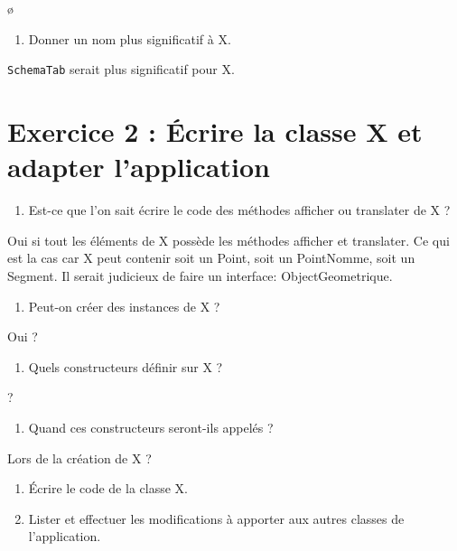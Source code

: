 \documentclass[
]{article}
\newcommand{\passthrough}[1]{#1}
\providecommand{\tightlist}{%
  \setlength{\itemsep}{0pt}\setlength{\parskip}{0pt}}
\begin{document}
ø

\begin{enumerate}
\def\labelenumi{\arabic{enumi}.}
\setcounter{enumi}{3}
\tightlist
\item
  Donner un nom plus significatif à X.
\end{enumerate}

\passthrough{\lstinline!SchemaTab!} serait plus significatif pour X.

\hypertarget{exercice-2-uxe9crire-la-classe-x-et-adapter-lapplication}{%
\section{Exercice 2 : Écrire la classe X et adapter
l'application}\label{exercice-2-uxe9crire-la-classe-x-et-adapter-lapplication}}

\begin{enumerate}
\def\labelenumi{\arabic{enumi}.}
\tightlist
\item
  Est-ce que l'on sait écrire le code des méthodes afficher ou
  translater de X ?
\end{enumerate}

Oui si tout les éléments de X possède les méthodes afficher et
translater. Ce qui est la cas car X peut contenir soit un Point, soit un
PointNomme, soit un Segment. Il serait judicieux de faire un interface:
ObjectGeometrique.

\begin{enumerate}
\def\labelenumi{\arabic{enumi}.}
\setcounter{enumi}{1}
\tightlist
\item
  Peut-on créer des instances de X ?
\end{enumerate}

Oui ?

\begin{enumerate}
\def\labelenumi{\arabic{enumi}.}
\setcounter{enumi}{2}
\tightlist
\item
  Quels constructeurs définir sur X ?
\end{enumerate}

?

\begin{enumerate}
\def\labelenumi{\arabic{enumi}.}
\setcounter{enumi}{3}
\tightlist
\item
  Quand ces constructeurs seront-ils appelés ?
\end{enumerate}

Lors de la création de X ?

\begin{enumerate}
\def\labelenumi{\arabic{enumi}.}
\setcounter{enumi}{4}
\item
  Écrire le code de la classe X.
\item
  Lister et effectuer les modifications à apporter aux autres classes de
  l'application.
\end{enumerate}
\end{document}

